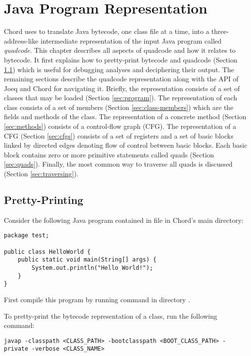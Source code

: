 \chapter{Java Program Representation}
\label{chap:program}

Chord uses  to translate
Java bytecode, one class file at a time, into a three-address-like
intermediate representation of the input Java program called {\it
quadcode}.  This chapter describes all aspects of quadcode and how it
relates to bytecode.  It first explains how to pretty-print bytecode
and quadcode (Section \ref{sec:pretty-printing}) which is useful for
debugging analyses and deciphering their output.  The remaining
sections describe the quadcode representation along with the API of
Joeq and Chord for navigating it.  Briefly, the representation
consists of a set of classes that may be loaded
(Section \ref{sec:program}).  The representation of each class consists
of a set of members (Section \ref{sec:class-members}) which are the fields and methods
of the class.  The representation of a concrete
method (Section \ref{sec:methods}) consists of a control-flow graph
(CFG).  The representation of a CFG (Section \ref{sec:cfgs}) consists
of a set of registers and a set of basic blocks linked by directed edges
denoting flow of control between basic blocks.
Each basic block contains zero or more primitive statements called quads
(Section \ref{sec:quads}).  Finally, the most common way to traverse
all quads is discussed (Section \ref{sec:traversing}).

\section{Pretty-Printing}
\label{sec:pretty-printing}

Consider the following Java program contained in
file  in Chord's
main directory:
\begin{framed}
\begin{verbatim}
package test;

public class HelloWorld {
    public static void main(String[] args) {
        System.out.println("Hello World!");
    }
}
\end{verbatim}
\end{framed}

First compile this program by running command  in
directory .

To pretty-print the bytecode representation of a class, run the following command:
\begin{framed}
\begin{verbatim}
javap -classpath <CLASS_PATH> -bootclasspath <BOOT_CLASS_PATH> -private -verbose <CLASS_NAME>
\end{verbatim}
\end{framed}

